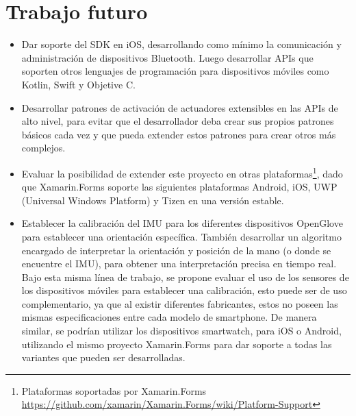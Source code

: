 \section{Trabajo futuro}

\begin{itemize}
	
	\item Dar soporte del SDK en iOS, desarrollando como mínimo la comunicación y administración de dispositivos Bluetooth. Luego desarrollar APIs que soporten otros lenguajes de programación para dispositivos móviles como Kotlin, Swift y Objetive C.
	
	\item Desarrollar patrones de activación de actuadores extensibles en las APIs de alto nivel, para evitar que el desarrollador deba crear sus propios patrones básicos cada vez y que pueda extender estos patrones para crear otros más complejos.
	
	
	\item Evaluar la posibilidad de extender este proyecto en otras plataformas\footnote{Plataformas soportadas por Xamarin.Forms \url{https://github.com/xamarin/Xamarin.Forms/wiki/Platform-Support}}, dado que Xamarin.Forms soporte las siguientes plataformas Android, iOS, UWP (Universal Windows Platform)  y Tizen en una versión estable.
	
	\item Establecer la calibración  del IMU para los diferentes dispositivos OpenGlove para establecer una orientación específica. También desarrollar un algoritmo encargado de interpretar la orientación y posición de la mano (o donde se encuentre el IMU), para obtener una interpretación precisa en tiempo real. Bajo esta misma línea de trabajo, se propone evaluar el uso de los sensores de los dispositivos móviles para establecer una calibración, esto puede ser de uso complementario, ya que al existir diferentes fabricantes, estos no poseen las mismas especificaciones entre cada modelo de smartphone. De manera similar, se podrían utilizar los dispositivos smartwatch, para iOS o Android, utilizando el mismo proyecto Xamarin.Forms para dar soporte a todas las variantes que pueden ser desarrolladas.
	

\end{itemize}
